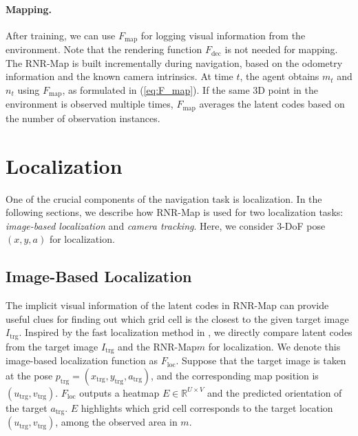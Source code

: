 \documentclass[10pt,twocolumn,letterpaper]{article}
\def\proposed{RNR-Map\xspace}
\begin{document}
\paragraph{Mapping.}
After training, we can use $F_\mathrm{map}$ for logging visual information from the environment.
%
Note that the rendering function $F_\mathrm{dec}$ is not needed for mapping.
%
The \proposed is built incrementally during navigation, based on the odometry information and the known camera intrinsics.
%
At time $t$, the agent obtains $m_t$ and $n_t$ using $F_\mathrm{map}$, as formulated in (\ref{eq:F_map}).
%
If the same 3D point in the environment is observed multiple times, $F_\mathrm{map}$ averages the latent codes based on the number of observation instances.
%





\section{Localization} \label{sec:loc_framework}
%
\vspace{-0.1cm}
One of the crucial components of the navigation task is localization.
%
In the following sections, we describe how \proposed is used for two localization tasks: \textit{image-based localization} and \textit{camera tracking}.
%
Here, we consider 3-DoF pose $(x, y, a)$ for localization.
%
\vspace{-0.1cm}
\subsection{Image-Based Localization}

The implicit visual information of the latent codes in \proposed can provide useful clues for finding out which grid cell is the closest to the given target image $I_\mathrm{trg}$.
%
Inspired by the fast localization method in \cite{MapNet}, we directly compare latent codes from the target image $I_\mathrm{trg}$ and the \proposed $m$ for localization.
%
We denote this image-based localization function as $F_\mathrm{loc}$.
%
Suppose that the target image is taken at the pose $p_\mathrm{trg} = (x_\mathrm{trg}, y_\mathrm{trg}, a_\mathrm{trg})$, and the corresponding map position is $(u_\mathrm{trg}, v_\mathrm{trg})$.
%
$F_\mathrm{loc}$ outputs a heatmap $E \in\mathbb{R}^{U\times V}$ and the predicted orientation of the target $a_\mathrm{trg}$.
%
$E$ highlights which grid cell corresponds to the target location $(u_\mathrm{trg}, v_\mathrm{trg})$, among the observed area in $m$.
\end{document}

